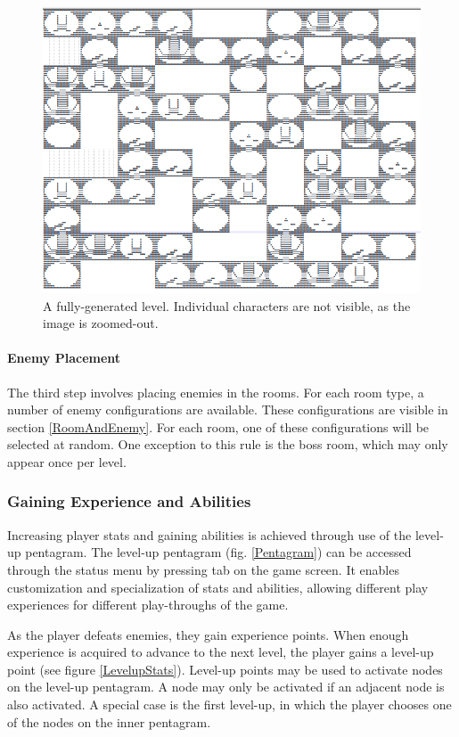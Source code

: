 \documentclass{article}
\begin{document}
\begin{figure}[h!]

\includegraphics[width=5in]{Graphics/textmaze.png}
\caption{A fully-generated level.  Individual characters are not visible, as the image is zoomed-out.}
\label{TextLevel}

\end{figure}

\paragraph{Enemy Placement}
The third step involves placing enemies in the rooms.  For each room type, a number of enemy configurations are available.  These configurations are visible in section \ref{RoomAndEnemy}.  For each room, one of these configurations will be selected at random.  One exception to this rule is the boss room, which may only appear once per level.

\subsubsection{Gaining Experience and Abilities}

Increasing player stats and gaining abilities is achieved through use of the level-up pentagram.  The level-up pentagram (fig. \ref{Pentagram}) can be accessed through the status menu by pressing tab on the game screen.  It enables customization and specialization of stats and abilities, allowing different play experiences for different play-throughs of the game.

As the player defeats enemies, they gain experience points.  When enough experience is acquired to advance to the next level, the player gains a level-up point (see figure \ref{LevelupStats}).  Level-up points may be used to activate nodes on the level-up pentagram.  A node may only be activated if an adjacent node is also activated.  A special case is the first level-up, in which the player chooses one of the nodes on the inner pentagram.
\end{document}
